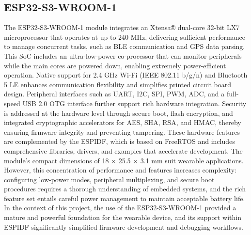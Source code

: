 \subsection{ESP32-S3-WROOM-1}  
The ESP32-S3-WROOM-1 module integrates an Xtensa® dual-core 32-bit LX7 microprocessor that operates at up to 240 \ac{MHz}, delivering sufficient performance to manage concurrent tasks, such as \ac{BLE} communication and \ac{GPS} data parsing. This \ac{SoC} includes an ultra-low-power co-processor that can monitor peripherals while the main cores are powered down, enabling extremely power-efficient operation. Native support for 2.4 \ac{GHz} Wi-Fi (IEEE 802.11 b/g/n) and Bluetooth 5 LE enhances communication flexibility and simplifies printed circuit board design. Peripheral interfaces such as \ac{UART}, \ac{I2C}, \ac{SPI}, PWM, ADC, and a full-speed \ac{USB} 2.0 OTG interface further support rich hardware integration. Security is addressed at the hardware level through secure boot, flash encryption, and integrated cryptographic accelerators for \ac{AES}, \ac{SHA}, \ac{RSA}, and \ac{HMAC}, thereby ensuring firmware integrity and preventing tampering. These hardware features are complemented by the \ac{ESPIDF}, which is based on \ac{FreeRTOS} and includes comprehensive libraries, drivers, and examples that accelerate development. The module’s compact dimensions of 18 × 25.5 × 3.1 mm suit wearable applications. However, this concentration of performance and features increases complexity: configuring low-power modes, peripheral multiplexing, and secure boot procedures requires a thorough understanding of embedded systems, and the rich feature set entails careful power management to maintain acceptable battery life. In the context of this project, the use of the ESP32-S3-WROOM-1 provided a mature and powerful foundation for the wearable device, and its support within \ac{ESPIDF} significantly simplified firmware development and debugging workflows\cite{esp32s3_1}.


